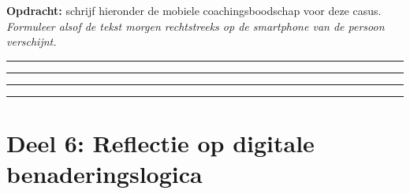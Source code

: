 \documentclass[11pt,a4paper]{article}
\newcommand{\writeline}{\vspace{0.22em}\noindent\rule{\linewidth}{0.25pt}\vspace{0.42em}\par}
\newcommand{\messagelines}{\writeline\writeline\writeline\writeline}
\begin{document}
\begin{responsebox}[title={Uw antwoord -- Deel 5}]
\small\textbf{Opdracht:} schrijf hieronder de mobiele coachingsboodschap voor deze casus.
\textit{Formuleer alsof de tekst morgen rechtstreeks op de smartphone van de persoon verschijnt.}

\messagelines
\end{responsebox}

\vspace{0.6em}
\newpage




\section{Deel 6: Reflectie op digitale benaderingslogica}
\end{document}
